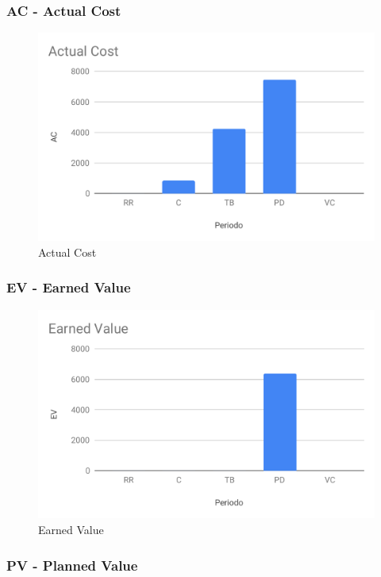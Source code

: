 \subsubsection{AC - Actual Cost}

\begin{figure}[H]
	\centering
	\includegraphics[scale=0.8]{res/images/RQ/ac.pdf}
	\caption{Actual Cost}
\end{figure}

\subsubsection{EV - Earned Value}

\begin{figure}[H]
	\centering
	\includegraphics[scale=0.8]{res/images/RQ/ev.pdf}
	\caption{Earned Value}
\end{figure}

\subsubsection{PV - Planned Value}

